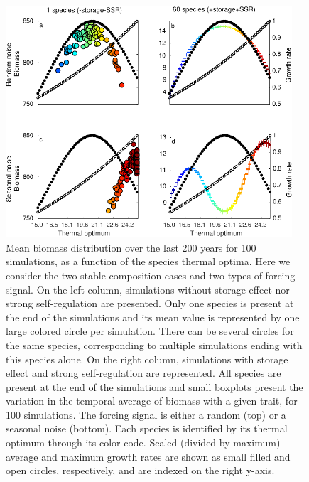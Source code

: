 \documentclass[a4paper,12pt]{article}
\begin{document}
\begin{figure}[!ht]
\begin{centering}
\includegraphics[bb=0bp 0bp 356bp 296bp,width=0.95\textwidth]{Fig3-eps-converted-to.pdf}
\par\end{centering}
\caption{Mean biomass distribution over the last 200 years for 100 simulations,
as a function of the species thermal optima. Here we consider the
two stable-composition cases and two types of forcing signal. On the
left column, simulations without storage effect nor strong self-regulation
are presented. Only one species is present at the end of the simulations
and its mean value is represented by one large colored circle per
simulation. There can be several circles for the same species, corresponding
to multiple simulations ending with this species alone. On the right
column, simulations with storage effect and strong self-regulation
are represented. All species are present at the end of the simulations
and small boxplots present the variation in the temporal average of
biomass with a given trait, for 100 simulations. The forcing signal
is either a random (top) or a seasonal noise (bottom). Each species
is identified by its thermal optimum through its color code. Scaled
(divided by maximum) average and maximum growth rates are shown as
small filled and open circles, respectively, and are indexed on the
right y-axis. \label{fig:Mean-biomass-in_stable_cases}}
\end{figure}
\end{document}
